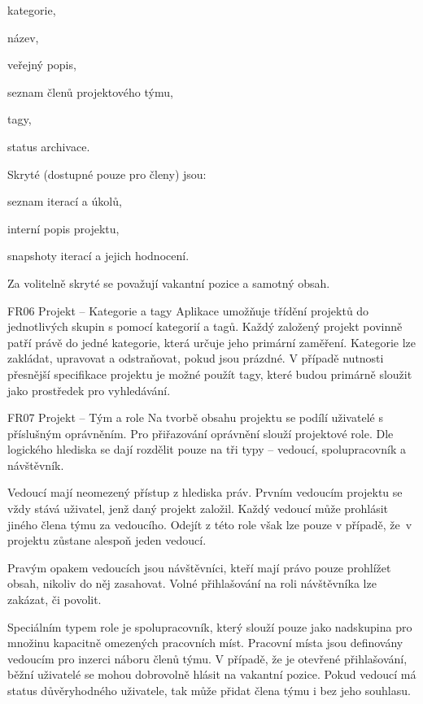 \begin{dl}
   \begin{ulnar}
      \item kategorie,
      \item název,
      \item veřejný popis,
      \item seznam členů projektového týmu,
      \item tagy,
      \item status archivace.
   \end{ulnar}


   Skryté (dostupné pouze pro členy) jsou: 

   \begin{ulnar}
      \item seznam iterací a úkolů, 
      \item interní popis projektu, 
      \item snapshoty iterací a jejich hodnocení.
   \end{ulnar}
   

   Za volitelně skryté se považují vakantní pozice a samotný obsah.

   \item[FR06 Projekt -- Kategorie a tagy]
   Aplikace umožňuje třídění projektů do jednotlivých skupin s pomocí kategorií a tagů. Každý založený projekt povinně patří právě do jedné kategorie, která určuje jeho primární zaměření. Kategorie lze zakládat, upravovat a odstraňovat, pokud jsou prázdné. V případě nutnosti přesnější specifikace projektu je možné použít tagy, které budou primárně sloužit jako prostředek pro vyhledávání.

   \item[FR07 Projekt -- Tým a role]
   Na tvorbě obsahu projektu se podílí uživatelé s příslušným oprávněním. Pro přiřazování oprávnění slouží projektové role. Dle logického hlediska se dají rozdělit pouze na tři typy -- vedoucí, spolupracovník a návštěvník.

   Vedoucí mají neomezený přístup z hlediska práv. Prvním vedoucím projektu se vždy stává uživatel, jenž daný projekt založil. Každý vedoucí může prohlásit jiného člena týmu za vedoucího. Odejít z této role však lze pouze v případě, že~v projektu zůstane alespoň jeden vedoucí.

   \newpage
   Pravým opakem vedoucích jsou návštěvníci, kteří mají právo pouze prohlížet obsah, nikoliv do něj zasahovat. Volné přihlašování na roli návštěvníka lze zakázat, či povolit.

   Speciálním typem role je spolupracovník, který slouží pouze jako nadskupina pro množinu kapacitně omezených pracovních míst. Pracovní místa jsou definovány vedoucím pro inzerci náboru členů týmu. V případě, že je otevřené přihlašování, běžní uživatelé se mohou dobrovolně hlásit na vakantní pozice. Pokud vedoucí má status důvěryhodného uživatele, tak může přidat člena týmu i bez jeho souhlasu.


\end{dl}
